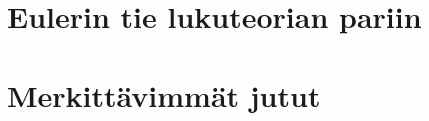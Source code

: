 \documentclass[a4paper,11pt]{article}
\begin{document}
\section{Eulerin tie lukuteorian pariin}

\section{Merkittävimmät jutut}


 
\nocite{*}
\printbibliography
 

 
\end{document}
